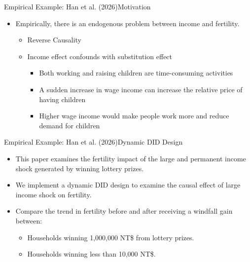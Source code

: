 \documentclass[dvipsnames,hyperref={pdfpagelabels=false}]{beamer}
\begin{document}
\begin{frame}{Empirical Example: Han et al. (2026)}{Motivation}
	\begin{itemize} 
		
	\item Empirically, there is an endogenous problem between income and fertility.
	\vspace{0.3cm}
	\begin{itemize} 
		\item Reverse Causality
		\vspace{0.3cm}
		\item Income effect confounds with substitution effect
		\vspace{0.3cm}
		\begin{itemize} 
			
			\item Both working and raising children are time-consuming activities				
			\vspace{0.3cm}	
			
			\item A sudden increase in wage income can increase the relative price of having children
			\vspace{0.3cm}
			\item Higher wage income would make people work more and reduce demand for children
			
			
			\vspace{0.3cm}
		\end{itemize}
		\end{itemize}	
	\end{itemize}	
\end{frame}










\begin{frame}{Empirical Example: Han et al. (2026)}{Dynamic DID Design}
	\begin{itemize} 
			
		\item This paper examines the fertility
		impact of the large and permanent income shock generated by winning lottery prizes.
		\vspace{0.3cm}
		\item We implement a dynamic DID design to examine the causal effect of large income shock on fertility.
				\vspace{0.3cm}
		\item Compare the trend in fertility before and after receiving a windfall gain between:
						\vspace{0.3cm}
			\begin{itemize} 
		\item Households winning 1,000,000 NT\$ from lottery prizes.
								\vspace{0.3cm}
		\item Households winning less than 10,000 NT\$. 
			\end{itemize}	
		
	\end{itemize}	
\end{frame}
\end{document}
